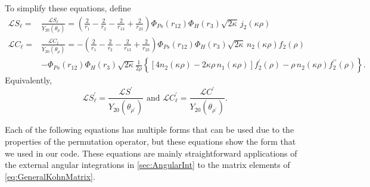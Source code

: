 \documentclass[Dissertation.tex]{subfiles}
\begin{document}
To simplify these equations, define
\begin{align}
\nonumber \mathscr{L} S_\ell = &\frac{\mathcal{L} S_\ell}{Y_{20}(\theta_\rho)} = \left(\frac{2}{r_1} - \frac{2}{r_2} - \frac{2}{r_{13}} + \frac{2}{r_{23}} \right) \Phi_{Ps}(r_{12}) \Phi_H(r_3) \sqrt{2\kappa} \, j_2(\kappa\rho) \\
\nonumber \mathscr{L} C_\ell = &\frac{\mathcal{L} C_\ell}{Y_{20}(\theta_\rho)} = - \left(\frac{2}{r_1} - \frac{2}{r_2} - \frac{2}{r_{13}} + \frac{2}{r_{23}} \right) \Phi_{Ps}(r_{12}) \Phi_H(r_3) \sqrt{2\kappa} \, n_2(\kappa\rho) f_{2}(\rho) \\
& - \Phi_{Ps}(r_{12}) \Phi_H(r_3) \sqrt{2\kappa} \frac{1}{2\rho} \left\{ \left[4 n_2(\kappa\rho) - 2 \kappa\rho \, n_1(\kappa\rho) \right] f_{2}^\prime(\rho) - \rho \, n_2(\kappa\rho) f_{2}^{\prime\prime}(\rho) \right\}.
\end{align}
Equivalently,
\begin{equation}
\mathscr{L} S_\ell^\prime = \frac{\mathcal{L} S^\prime}{Y_{20}(\theta_{\rho^\prime})} \text{ and }
\mathscr{L} C_\ell^\prime = \frac{\mathcal{L} C^\prime}{Y_{20}(\theta_{\rho^\prime})}.
\end{equation}

Each of the following equations has multiple forms that can be used due to the
properties of the permutation operator, but these equations show the form that
we used in our code. These 
equations are mainly straightforward applications of the external angular
integrations in \cref{sec:AngularInt} to the matrix elements of
\cref{eq:GeneralKohnMatrix}.
\end{document}
